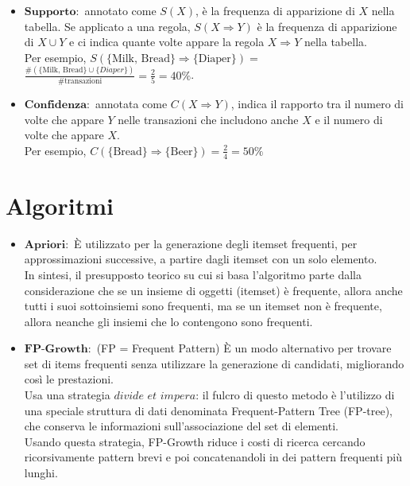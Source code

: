         \begin{itemize}
            \item $\textbf{Supporto}:$ annotato come $S \left( X \right)$, è la frequenza di apparizione di $X$ nella tabella.
                Se applicato a una regola, $S \left( X \Rightarrow Y \right)$ è la frequenza di apparizione di $X \cup Y$ e ci indica quante volte appare la regola $X \Rightarrow Y$ nella tabella.
                \\[1\baselineskip]
                Per esempio, $S \left( \textrm{\{Milk, Bread\}} \Rightarrow \textrm{\{Diaper\}} \right) =$
                \\[0.2\baselineskip]
                $\frac{\#(\textrm{\{Milk, Bread\}} \cup \{Diaper\})}{\#\textrm{transazioni}} = \frac{2}{5} = 40\%$.
                \\[0.5\baselineskip]

            \item $\textbf{Confidenza}:$ annotata come $C \left( X \Rightarrow Y \right)$, indica il rapporto tra il numero di volte che appare $Y$ nelle transazioni che includono anche $X$ e il numero di volte che appare $X$.
                \\[1\baselineskip]
                Per esempio, $C \left( \textrm{\{Bread\}} \Rightarrow \textrm{\{Beer\}} \right) = \frac{2}{4} = 50\%$
        \end{itemize}

    \section{Algoritmi}
        \begin{itemize}
            \item $\textbf{Apriori}:$ È utilizzato per la generazione degli itemset frequenti, per approssimazioni successive, a partire dagli itemset con un solo elemento.
                \\[1\baselineskip]
                In sintesi, il presupposto teorico su cui si basa l'algoritmo parte dalla considerazione che se un insieme di oggetti (itemset) è frequente, allora anche tutti i suoi sottoinsiemi sono frequenti, ma se un itemset non è frequente, allora neanche gli insiemi che lo contengono sono frequenti.

            \item $\textbf{FP-Growth}:$ (FP = Frequent Pattern) È un modo alternativo per trovare set di items frequenti senza utilizzare la generazione di candidati, migliorando così le prestazioni.
                \\[1\baselineskip]
                Usa una strategia $\textit{divide et impera}$: il fulcro di questo metodo è l'utilizzo di una speciale struttura di dati denominata Frequent-Pattern Tree (FP-tree), che conserva le informazioni sull'associazione del set di elementi.
                \\[1\baselineskip]
                Usando questa strategia, FP-Growth riduce i costi di ricerca cercando ricorsivamente pattern brevi e poi concatenandoli in dei pattern frequenti più lunghi.
        \end{itemize}

